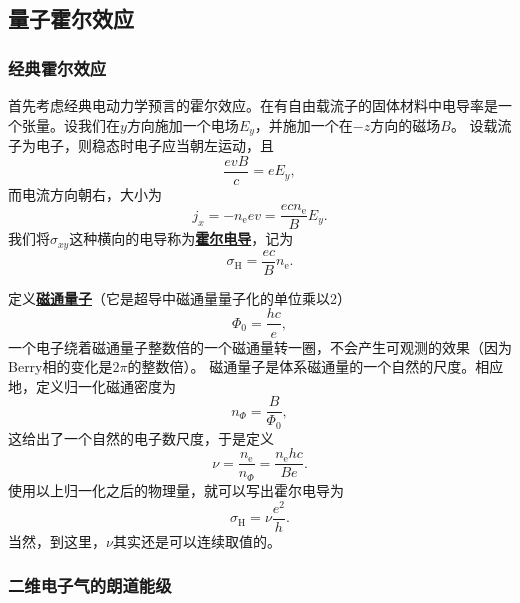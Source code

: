 \documentclass[hyperref, UTF8, a4paper]{ctexart}
\newcommand*{\concept}[1]{\underline{\textbf{#1}}}
\begin{document}
\subsection{量子霍尔效应}

\subsubsection{经典霍尔效应}

首先考虑经典电动力学预言的霍尔效应。在有自由载流子的固体材料中电导率是一个张量。设我们在$y$方向施加一个电场$E_y$，并施加一个在$-z$方向的磁场$B$。
设载流子为电子，则稳态时电子应当朝左运动，且
\[
    \frac{e v B}{c} = e E_y,
\]
而电流方向朝右，大小为
\[
    j_x = - n_\text{e} e v = \frac{e c n_\text{e}}{B} E_y.
\]
我们将$\sigma_{xy}$这种横向的电导称为\concept{霍尔电导}，记为
\begin{equation}
    \sigma_\text{H} = \frac{ec}{B} n_\text{e}.
\end{equation}

定义\concept{磁通量子}（它是超导中磁通量量子化的单位乘以2）
\begin{equation}
    \Phi_0 = \frac{h c}{e},
\end{equation}
一个电子绕着磁通量子整数倍的一个磁通量转一圈，不会产生可观测的效果（因为Berry相的变化是$2\pi$的整数倍）。
磁通量子是体系磁通量的一个自然的尺度。相应地，定义归一化磁通密度为
\begin{equation}
    n_{\Phi} = \frac{B}{\Phi_0},
\end{equation}
这给出了一个自然的电子数尺度，于是定义
\begin{equation}
    \nu = \frac{n_\text{e}}{n_\Phi} = \frac{n_\text{e} h c}{B e}.
\end{equation}
使用以上归一化之后的物理量，就可以写出霍尔电导为
\begin{equation}
    \sigma_\text{H} = \nu \frac{e^2}{h}.
\end{equation}
当然，到这里，$\nu$其实还是可以连续取值的。

\subsubsection{二维电子气的朗道能级}
\end{document}

